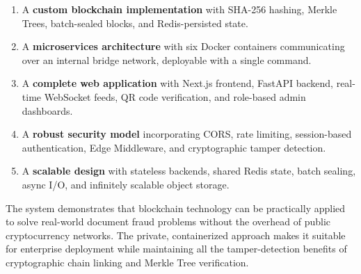 \documentclass[12pt, a4paper]{report}
\begin{document}
\begin{enumerate}
    \item A \textbf{custom blockchain implementation} with SHA-256 hashing,
          Merkle Trees, batch-sealed blocks, and Redis-persisted state.
    \item A \textbf{microservices architecture} with six Docker containers
          communicating over an internal bridge network, deployable with a single
          command.
    \item A \textbf{complete web application} with Next.js frontend, FastAPI
          backend, real-time WebSocket feeds, QR code verification, and
          role-based admin dashboards.
    \item A \textbf{robust security model} incorporating CORS, rate limiting,
          session-based authentication, Edge Middleware, and cryptographic tamper
          detection.
    \item A \textbf{scalable design} with stateless backends, shared Redis
          state, batch sealing, async I/O, and infinitely scalable object
          storage.
\end{enumerate}

The system demonstrates that blockchain technology can be practically applied
to solve real-world document fraud problems without the overhead of public
cryptocurrency networks. The private, containerized approach makes it suitable
for enterprise deployment while maintaining all the tamper-detection benefits
of cryptographic chain linking and Merkle Tree verification.
\end{document}
